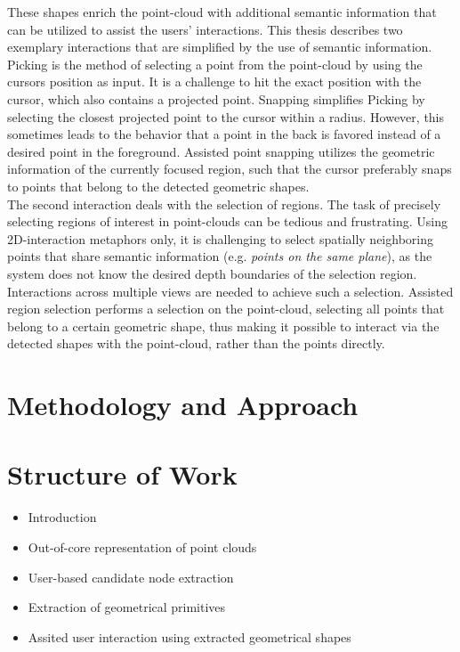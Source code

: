 \documentclass[]{article}
\begin{document}
These shapes enrich the point-cloud with additional semantic information that can be utilized to assist the users' interactions. This thesis describes two exemplary interactions that are simplified by the use of semantic information. 
\\
Picking is the method of selecting a point from the point-cloud by using the cursors position as input. It is a challenge to hit the exact position with the cursor, which also contains a projected point. Snapping simplifies Picking by selecting the closest projected point to the cursor within a radius. However, this sometimes leads to the behavior that a point in the back is favored instead of a desired point in the foreground. Assisted point snapping utilizes the geometric information of the currently focused region, such that the cursor preferably snaps to points that belong to the detected geometric shapes. 
\\
The second interaction deals with the selection of regions. The task of precisely selecting regions of interest in point-clouds can be tedious and frustrating. Using 2D-interaction metaphors only, it is challenging to select spatially neighboring points that share semantic information (e.g. \textit{points on the same plane}), as the system does not know the desired depth boundaries of the selection region. Interactions across multiple views are needed to achieve such a selection. Assisted region selection performs a selection on the point-cloud, selecting all points that belong to a certain geometric shape, thus making it possible to interact via the detected shapes with the point-cloud, rather than the points directly. 




\section{Methodology and Approach}

\section{Structure of Work}
\begin{itemize}
	\item Introduction
	\item Out-of-core representation of point clouds
	\item User-based candidate node extraction
	\item Extraction of geometrical primitives
	\item Assited user interaction using extracted geometrical shapes
\end{itemize}
\end{document}
